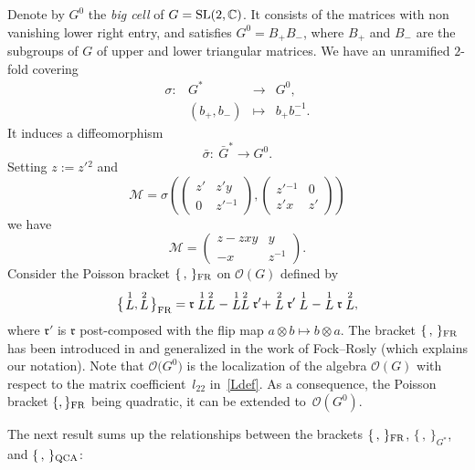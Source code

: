 \documentclass[pdftex]{sigma}%
\numberwithin{equation}{section}
\numberwithin{figure}{section}
\newcommand{\fonc}[5]{ %
 \begin{array}{lcll}#1 :& #2 & \longrightarrow & #3 \\ %
 &#4 &\longmapsto & #5 %
 \end{array}}
\newcommand{\mc}{\mathbb{C}}
\newcommand{\ra}{\rightarrow}
\begin{document}
Denote by $G^0$ the {\it big cell} of $G={\rm SL}(2,\mc)$. It consists of the matrices with non vanishing lower right entry, and satisfies $G^0 = B_+B_-$, where $B_+$ and $B_-$ are the subgroups of $G$ of upper and lower triangular matrices. We have an unramified $2$-fold covering
\[
\fonc{\sigma}{G^*}{G^0,}{(b_+,b_-)}{b_+ b_-^{-1}.}
\]
It induces a diffeomorphism
\[
\bar \sigma \colon\ \bar G^* \ra G^0.
\]
Setting $z:=z'{}^2$ and
\begin{equation}\label{formmatG}
\mathcal{M} =\sigma \left(\begin{pmatrix} z' & z'y \\ 0 & z'{}^{-1} \end{pmatrix}\!, \begin{pmatrix} z'{}^{-1} & 0 \\ z'x & z' \end{pmatrix} \right)
\end{equation}
we have
\[
\mathcal{M} =\begin{pmatrix} z-z x y&y \\-x&z^{-1}\end{pmatrix}\!.
\]
Consider the Poisson bracket $\{\, ,\, \}_{\rm FR}$ on $\mathcal{O}(G)$ defined by
\[
\big\{\!\stackrel{1}{L},\stackrel{2}{L}\!\big\}_{\rm FR} = \mathfrak{r}\stackrel{1}{L}\stackrel{2}{L} -\stackrel{1}{L}\stackrel{2}{L}\mathfrak{r}'+\stackrel{2}{L}\mathfrak{r}'\stackrel{1}{L} -\stackrel{1}{L}\mathfrak{r}\stackrel{2}{L},
\]
where $\mathfrak{r}'$ is $\mathfrak{r}$ post-composed with the flip map $a\otimes b \mapsto b\otimes a$. The bracket $\{\, ,\, \}_{\rm FR}$ has been introduced in \cite{STS} and generalized in the work of Fock--Rosly \cite{FR} (which explains our notation).
Note that $\mathcal{O}\big(G^0\big)$ is the localization of the algebra $\mathcal{O}(G)$ with respect to the matrix coefficient~$l_{22}$ in~\eqref{Ldef}. As a consequence, the Poisson bracket $\{ ,\}_{\rm FR}$ being quadratic, it can be extended to~$\mathcal{O}(G^0)$.

The next result sums up the relationships between the brackets $\{\, ,\, \}_{\rm FR}$, $\{\, ,\, \}_{G^*}$, and $\{\, ,\, \}_{\rm QCA}$:
\end{document}
